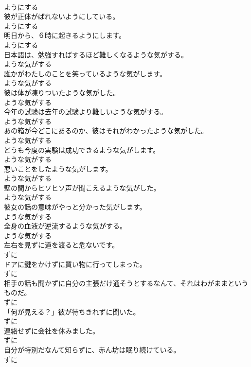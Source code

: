 \documentclass[8pt]{extreport}
\begin{document}
\begin{CJK}{UTF8}{min}
\\	ようにする
\\	彼が正体がばれないようにしている。	
\\	ようにする
\\	明日から、６時に起きるようにします。	
\\	ようにする
\\	日本語は、勉強すればするほど難しくなるような気がする。	
\\	ような気がする
\\	誰かがわたしのことを笑っているような気がします。	
\\	ような気がする
\\	彼は体が凍りついたような気がした。	
\\	ような気がする
\\	今年の試験は去年の試験より難しいような気がする。	
\\	ような気がする
\\	あの箱が今どこにあるのか、彼はそれがわかったような気がした。	
\\	ような気がする
\\	どうも今度の実験は成功できるような気がします。	
\\	ような気がする
\\	悪いことをしたような気がします。	
\\	ような気がする
\\	壁の間からヒソヒソ声が聞こえるような気がした。	
\\	ような気がする
\\	彼女の話の意味がやっと分かった気がします。	
\\	ような気がする
\\	全身の血液が逆流するような気がする。	
\\	ような気がする
\\	左右を見ずに道を渡ると危ないです。	
\\	ずに
\\	ドアに鍵をかけずに買い物に行ってしまった。	
\\	ずに
\\	相手の話も聞かずに自分の主張だけ通そうとするなんて、それはわがままというものだ。	
\\	ずに
\\	「何が見える？」彼が待ちきれずに聞いた。	
\\	ずに
\\	連絡せずに会社を休みました。	
\\	ずに
\\	自分が特別だなんて知らずに、赤ん坊は眠り続けている。	
\\	ずに

\end{CJK}
\end{document}
